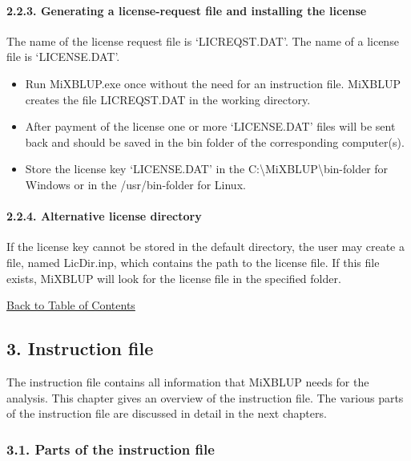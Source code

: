 \paragraph{2.2.3. Generating a license-request file and installing the
license}\label{HowT06}

The name of the license request file is `LICREQST.DAT'. The name of a
license file is `LICENSE.DAT'.

\begin{itemize}
\tightlist
\item
  Run MiXBLUP.exe once without the need for an instruction file. MiXBLUP
  creates the file LICREQST.DAT in the working directory.\\
\item
  After payment of the license one or more `LICENSE.DAT' files will be
  sent back and should be saved in the bin folder of the corresponding
  computer(s).\\
\item
  Store the license key `LICENSE.DAT' in the
  C:\textbackslash MiXBLUP\textbackslash bin-folder for Windows or in
  the /usr/bin-folder for Linux.
\end{itemize}

\paragraph{2.2.4. Alternative license directory}\label{HowT07}

If the license key cannot be stored in the default directory, the user
may create a file, named LicDir.inp, which contains the path to the
license file. If this file exists, MiXBLUP will look for the license
file in the specified folder.

\hyperref[Tabl01]{Back to Table of Contents}

\newpage

\subsection{3. Instruction file}\label{Inst01}

The instruction file contains all information that MiXBLUP needs for the
analysis. This chapter gives an overview of the instruction file. The
various parts of the instruction file are discussed in detail in the
next chapters.

\subsubsection{3.1. Parts of the instruction file}\label{Inst02}

